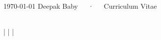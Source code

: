 \documentclass[]{awesome-cv}
\begin{document}

\makecvfooter
  {\today}
  {Deepak Baby~~~·~~~Curriculum Vitae}
  {\thepage}
 
\begin{center}
	 ~ \\
	\vspace{2mm}
	\href{mailto:deepakbabycet@gmail.com}{\faEnvelope} | \href{https://github.com/deepakbaby}{\faGithub} | \href{https://www.linkedin.com/in/deepakbaby/}{\faLinkedin} |  \href{https://scholar.google.be/citations?user=69q7FOYAAAAJ&hl=en}{\faBook}
\end{center}
\end{document}
